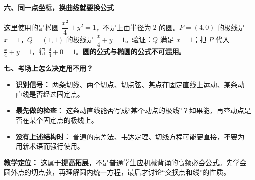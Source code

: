 \begin{explanationbox}
\medskip
\par\medskip\noindent\begin{minipage}{\linewidth}
\textbf{\textcolor{CExplanation}{六、同一点坐标，换曲线就要换公式}}
\begin{center}\end{center}
这里使用的是椭圆 $\dfrac{x^2}{4}+y^2=1$，不是上面半径为 $2$ 的圆。$P=(4,0)$ 的极线是 $x=1$，$Q=(1,1)$ 的极线是 $\dfrac{x}{4}+y=1$。验证：$Q$ 满足 $x=1$；把 $P$ 代入 $\frac{x}{4}+y=1$，得 $\frac44+0=1$。\textbf{圆的公式与椭圆的公式不可混用。}
\end{minipage}\par

\medskip
\textbf{\textcolor{CExplanation}{七、考场上怎么决定用不用？}}
\begin{itemize}[leftmargin=*,itemsep=0.4em]
\item \textbf{识别信号：} 两条切线、两个切点、切点弦、某点在固定直线上运动、某条动直线是否经过固定点。
\item \textbf{最先做的检查：} 这条动直线能否写成“某个动点的极线”？如果能，再查动点是否在某个固定点的极线上。
\item \textbf{没有上述结构时：} 普通的点差法、韦达定理、切线方程可能更直接，不要为用新术语而强行使用。
\end{itemize}
\textbf{教学定位：} 这属于\textbf{提高拓展}，不是普通学生应机械背诵的高频必会公式。先学会圆外点的切点弦，再理解圆内统一方程，最后才讨论“交换点和线”的性质。
\end{explanationbox}
